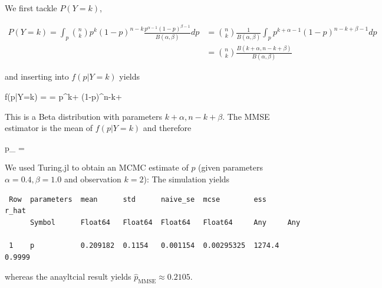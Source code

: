 We first tackle $P(Y=k)$,

\begin{align*}
P(Y=k) = \int_p {n \choose k} p^k (1-p)^{n-k} \frac{p^{\alpha-1} (1-p)^{\beta-1}}{B(\alpha, \beta)} dp &= {n \choose k} \frac{1}{B(\alpha, \beta)} \int_p p^{k + \alpha-1} (1-p)^{n-k+\beta-1} dp \\
&= {n \choose k} \frac{ B(k + \alpha, n-k+\beta) }{B(\alpha, \beta)}
\end{align*}

and inserting into $f(p|Y=k)$ yields

\bee
f(p|Y=k) =  =  p^{k+} (1-p)^{n-k+}
\eee

This is a Beta distribution with parameters $k+\alpha, n-k+\beta$. The MMSE estimator is the mean of $f(p|Y=k)$ and therefore

\bee
\hat p_{} = 
\eee

We used Turing.jl to obtain an MCMC estimate of $p$ (given parameters $\alpha=0.4, \beta=1.0$ and observation $k=2$): The simulation yields 

\begin{verbatim}
 Row  parameters  mean      std      naive_se  mcse        ess     r_hat  
      Symbol      Float64   Float64  Float64   Float64     Any     Any    

 1    p           0.209182  0.1154   0.001154  0.00295325  1274.4  0.9999 
\end{verbatim}

whereas the anayltcial result yields $\hat p_{\text{MMSE}} \approx 0.2105$.

